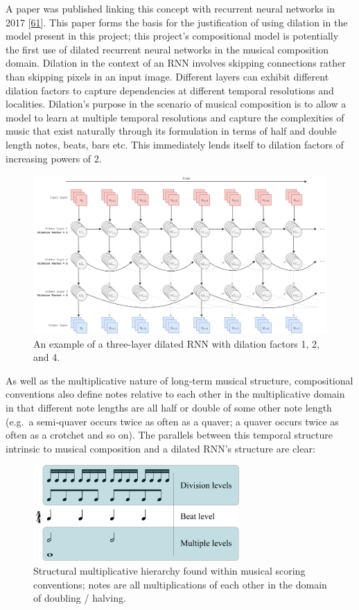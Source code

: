 \documentclass[12pt,]{article}
\begin{document}
A paper was published linking this concept with recurrent neural
networks in 2017 {[}\protect\hyperlink{ref-chang2017dilated}{61}{]}.
This paper forms the basis for the justification of using dilation in
the model present in this project; this project's compositional model is
potentially the first use of dilated recurrent neural networks in the
musical composition domain. Dilation in the context of an RNN involves
skipping connections rather than skipping pixels in an input image.
Different layers can exhibit different dilation factors to capture
dependencies at different temporal resolutions and localities.
Dilation's purpose in the scenario of musical composition is to allow a
model to learn at multiple temporal resolutions and capture the
complexities of music that exist naturally through its formulation in
terms of half and double length notes, beats, bars etc. This immediately
lends itself to dilation factors of increasing powers of 2.

\begin{figure}
\centering
\includegraphics[width=1\textwidth,height=\textheight]{Images/dilatedrnn.png}
\caption{An example of a three-layer dilated RNN with dilation factors
1, 2, and 4.}
\end{figure}

As well as the multiplicative nature of long-term musical structure,
compositional conventions also define notes relative to each other in
the multiplicative domain in that different note lengths are all half or
double of some other note length (e.g.~a semi-quaver occurs twice as
often as a quaver; a quaver occurs twice as often as a crotchet and so
on). The parallels between this temporal structure intrinsic to musical
composition and a dilated RNN's structure are clear:

\begin{figure}
\centering
\includegraphics[width=0.7\textwidth,height=\textheight]{Images/Metric_levels.png}
\caption{Structural multiplicative hierarchy found within musical
scoring conventions; notes are all multiplications of each other in the
domain of doubling / halving.}
\end{figure}
\end{document}
